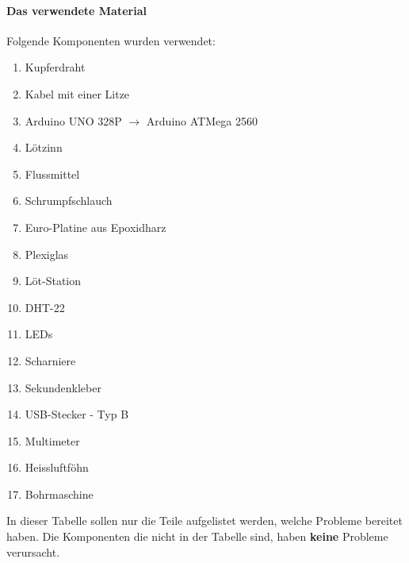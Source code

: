\documentclass{article}
\begin{document}
\paragraph{Das verwendete Material} 
Folgende Komponenten wurden verwendet: 
\begin{enumerate}
\item Kupferdraht
\item Kabel mit einer Litze
\item Arduino UNO 328P $\rightarrow$ Arduino ATMega 2560
\item Lötzinn
\item Flussmittel
\item Schrumpfschlauch
\item Euro-Platine aus Epoxidharz
\item Plexiglas
\item Löt-Station
\item DHT-22
\item LEDs
\item Scharniere
\item Sekundenkleber
\item USB-Stecker - Typ B
\item Multimeter
\item Heissluftföhn
\item Bohrmaschine
\end{enumerate}
In dieser Tabelle sollen nur die Teile aufgelistet werden, welche Probleme bereitet haben. Die Komponenten die nicht in der Tabelle sind, haben \textbf{keine} Probleme verursacht.
\newpage
\end{document}
